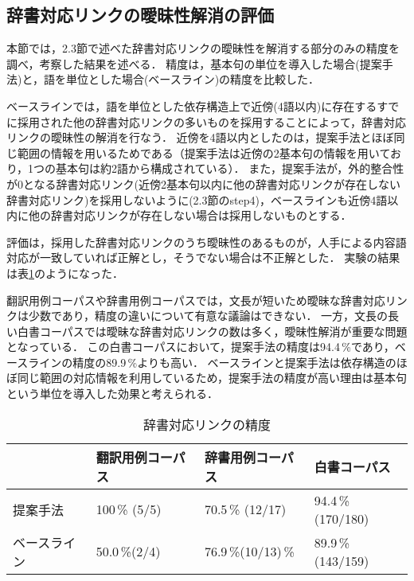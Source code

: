 \subsection{辞書対応リンクの曖昧性解消の評価}

本節では，2.3節で述べた辞書対応リンクの曖昧性を解消する部分のみの精度を調べ，考察した結果を述べる．
精度は，基本句の単位を導入した場合(提案手法)と，語を単位とした場合(ベースライン)の精度を比較した．


ベースラインでは，語を単位とした依存構造上で近傍(4語以内)に存在するすでに採用された他の辞書対応リンクの多いものを採用することによって，辞書対応リンクの曖昧性の解消を行なう．
近傍を4語以内としたのは，提案手法とほぼ同じ範囲の情報を用いるためである（提案手法は近傍の2基本句の情報を用いており，1つの基本句は約2語から構成されている）．
また，提案手法が，外的整合性が0となる辞書対応リンク(近傍2基本句以内に他の辞書対応リンクが存在しない辞書対応リンク)を採用しないように(2.3節のstep4)，ベースラインも近傍4語以内に他の辞書対応リンクが存在しない場合は採用しないものとする．




評価は，採用した辞書対応リンクのうち曖昧性のあるものが，人手による内容語対応が一致していれば正解とし，そうでない場合は不正解とした．
実験の結果は表\ref{tb辞書引き精度}のようになった．

翻訳用例コーパスや辞書用例コーパスでは，文長が短いため曖昧な辞書対応リンクは少数であり，精度の違いについて有意な議論はできない．
一方，文長の長い白書コーパスでは曖昧な辞書対応リンクの数は多く，曖昧性解消が重要な問題となっている．
この白書コーパスにおいて，提案手法の精度は94.4\,\%であり，ベースラインの精度の89.9\,\%よりも高い．
ベースラインと提案手法は依存構造のほぼ同じ範囲の対応情報を利用しているため，提案手法の精度が高い理由は基本句という単位を導入した効果と考えられる．

\begin{table}
\begin{center}
\begin{tabular}{llll}
\hline
			&翻訳用例コーパス	&辞書用例コーパス	&白書コーパス		\\
\hline                                  
	提案手法	&	100\,\% (5/5)	&	70.5\,\% (12/17)	&	94.4\,\%(170/180)	\\
	ベースライン	&	50.0\,\%(2/4)	&	76.9\,\%(10/13)\,\%	&	89.9\,\%(143/159)	\\
\hline
\end{tabular}
\caption{辞書対応リンクの精度}
\label{tb辞書引き精度}
\end{center}
\end{table}


